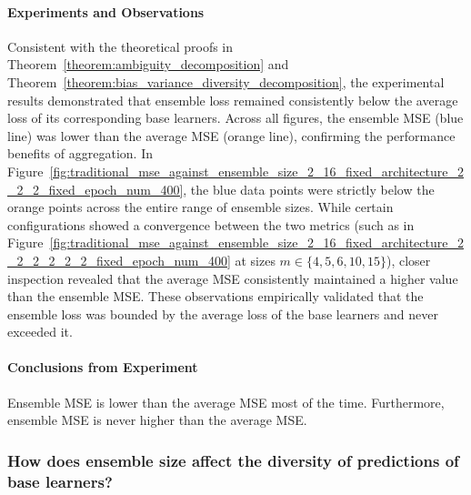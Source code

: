\documentclass{article}
\begin{document}
\paragraph{Experiments and Observations}
Consistent with the theoretical proofs in Theorem~\ref{theorem:ambiguity_decomposition} and Theorem~\ref{theorem:bias_variance_diversity_decomposition}, the experimental results demonstrated that ensemble loss remained consistently below the average loss of its corresponding base learners. Across all figures, the ensemble MSE (blue line) was lower than the average MSE (orange line), confirming the performance benefits of aggregation. In Figure~\ref{fig:traditional_mse_against_ensemble_size_2_16_fixed_architecture_2_2_2_fixed_epoch_num_400}, the blue data points were strictly below the orange points across the entire range of ensemble sizes. While certain configurations showed a convergence between the two metrics (such as in Figure~\ref{fig:traditional_mse_against_ensemble_size_2_16_fixed_architecture_2_2_2_2_2_2_fixed_epoch_num_400} at sizes $m \in \{4, 5, 6, 10, 15\}$), closer inspection revealed that the average MSE consistently maintained a higher value than the ensemble MSE. These observations empirically validated that the ensemble loss was bounded by the average loss of the base learners and never exceeded it. 

\paragraph{Conclusions from Experiment}
Ensemble MSE is lower than the average MSE most of the time. Furthermore, ensemble MSE is never higher than the average MSE. 


\subsubsection{How does ensemble size affect the diversity of predictions of base learners? }
\end{document}
